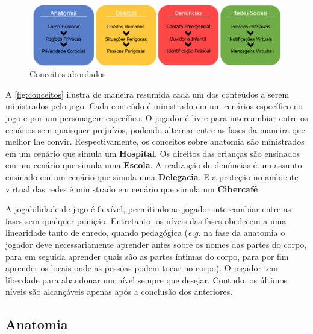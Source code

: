 \begin{figure}[hbt!]
  \caption{\label{fig:conceitos}Conceitos abordados}\vspace{-0.3cm}
  \begin{center}
    \includegraphics[width=\linewidth]{./Visuais/EsquemaFases2.pdf}
    \end{center}\vspace{-0.3cm}
\end{figure}

\vspace{-0.4cm}

A \autoref{fig:conceitos} ilustra de maneira resumida cada um dos conteúdos a serem ministrados pelo jogo. Cada conteúdo é ministrado em um cenários específico no jogo e por um personagem específico. O jogador é livre para intercambiar entre os cenários sem quaisquer prejuízos, podendo alternar entre as fases da maneira que melhor lhe convir. Respectivamente, os conceitos sobre anatomia são ministrados em um cenário que simula um \textbf{Hospital}. Os direitos das crianças são ensinados em um cenário que simula uma \textbf{Escola}. A realização de denúncias é um assunto ensinado em um cenário que simula uma \textbf{Delegacia}. E a proteção no ambiente virtual das redes é ministrado em cenário que simula um \textbf{Cibercafé}.

A jogabilidade de jogo é flexível, permitindo ao jogador intercambiar entre as fases sem qualquer punição. Entretanto, os níveis das fases obedecem a uma linearidade tanto de enredo, quando pedagógica (\textit{e.g.} na fase da anatomia o jogador deve necessariamente aprender antes sobre os nomes das partes do corpo, para em seguida aprender quais são as partes íntimas do corpo, para por fim aprender os locais onde as pessoas podem tocar no corpo). O jogador tem liberdade para abandonar um nível sempre que desejar. Contudo, os últimos níveis são alcançáveis apenas após a conclusão dos anteriores. 


\subsection{Anatomia}\label{subsec:1}

